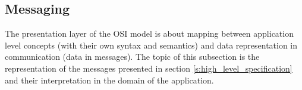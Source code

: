 \documentclass{article}
\begin{document}


  \subsection{Messaging}

   The presentation layer of the OSI model is about mapping between application
   level concepts (with their own syntax and semantics) and data representation
   in communication (data in messages). The topic of this subsection is the
   representation of the messages presented in section
   \ref{s:high_level_specification} and their interpretation in the domain of the
   application.
   

\end{document}
